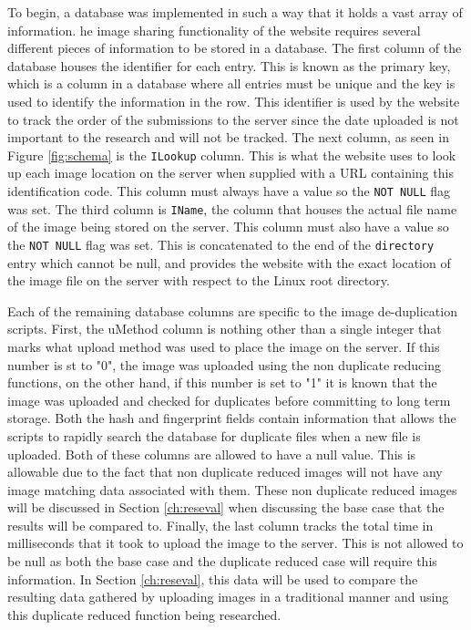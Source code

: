 To begin, a database was implemented in such a way that it holds a vast array of information. he image sharing functionality of the website requires several different pieces of information to be stored in a database. The first column of the database houses the identifier for each entry. This is known as the primary key, which is a column in a database where all entries must be unique and the key is used to identify the information in the row. This identifier is used by the website to track the order of the submissions to the server since the date uploaded is not important to the research and will not be tracked. The next column, as seen in Figure \ref{fig:schema} is the {\tt ILookup} column. This is what the website uses to look up each image location on the server when supplied with a URL containing this identification code. This column must always have a value so the {\tt NOT NULL} flag was set. The third column is {\tt IName}, the column that houses the actual file name of the image being stored on the server. This column must also have a value so the {\tt NOT NULL} flag was set. This is concatenated to the end of the {\tt directory} entry which cannot be null, and provides the website with the exact location of the image file on the server with respect to the Linux root directory.

Each of the remaining database columns are specific to the image de-duplication scripts. First, the uMethod column is nothing other than a single integer that marks what upload method was used to place the image on the server. If this number is st to "0", the image was uploaded using the non duplicate reducing functions, on the other hand, if this number is set to "1" it is known that the image was uploaded and checked for duplicates before committing to long term storage. Both the hash and fingerprint fields contain information that allows the scripts to rapidly search the database for duplicate files when a new file is uploaded.  Both of these columns are allowed to have a null value. This is allowable due to the fact that non duplicate reduced images will not have any image matching data associated with them. These non duplicate reduced images will be discussed in Section \ref{ch:reseval} when discussing the base case that the results will be compared to. Finally, the last column tracks the total time in milliseconds that it took to upload the image to the server. This is not allowed to be null as both the base case and the duplicate reduced case will require this information. In Section \ref{ch:reseval}, this data will be used to compare the resulting data gathered by uploading images in a traditional manner and using this duplicate reduced function being researched.

